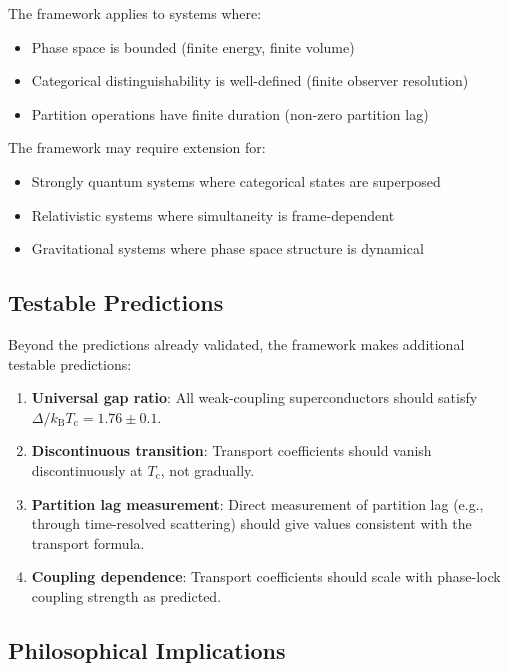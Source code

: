 \documentclass[twocolumn,10pt,aps,prd,superscriptaddress,nofootinbib]{revtex4-2}
\theoremstyle{remark}
\newcommand{\kB}{k_{\mathrm{B}}}
\newcommand{\Tcrit}{T_{\mathrm{c}}}
\begin{document}
The framework applies to systems where:
\begin{itemize}
\item Phase space is bounded (finite energy, finite volume)
\item Categorical distinguishability is well-defined (finite observer resolution)
\item Partition operations have finite duration (non-zero partition lag)
\end{itemize}

The framework may require extension for:
\begin{itemize}
\item Strongly quantum systems where categorical states are superposed
\item Relativistic systems where simultaneity is frame-dependent
\item Gravitational systems where phase space structure is dynamical
\end{itemize}

\subsection{Testable Predictions}

Beyond the predictions already validated, the framework makes additional testable predictions:

\begin{enumerate}
\item \textbf{Universal gap ratio}: All weak-coupling superconductors should satisfy $\Delta/\kB\Tcrit = 1.76 \pm 0.1$.

\item \textbf{Discontinuous transition}: Transport coefficients should vanish discontinuously at $\Tcrit$, not gradually.

\item \textbf{Partition lag measurement}: Direct measurement of partition lag (e.g., through time-resolved scattering) should give values consistent with the transport formula.

\item \textbf{Coupling dependence}: Transport coefficients should scale with phase-lock coupling strength as predicted.
\end{enumerate}

\subsection{Philosophical Implications}
\end{document}
